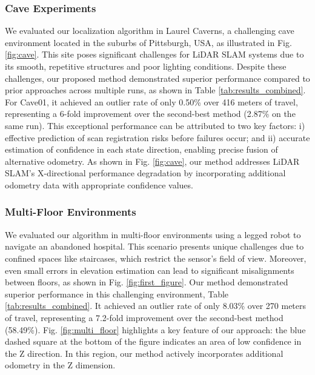 \subsubsection{\textbf{Cave Experiments}}
\newcommand{\cmark}{\ding{51}}%
\newcommand{\xmark}{\ding{55}}%
\setlength{\tabcolsep}{5pt}

We evaluated our localization algorithm in Laurel Caverns, a challenging cave environment located in the suburbs of Pittsburgh, USA, as illustrated in Fig. \ref{fig:cave}. This site poses significant challenges for LiDAR SLAM systems due to its smooth, repetitive structures and poor lighting conditions.
Despite these challenges, our proposed method demonstrated superior performance compared to prior approaches across multiple runs, as shown in Table \ref{tab:results_combined}. For Cave01, it achieved an outlier rate of only 0.50\% over 416 meters of travel, representing a 6-fold improvement over the second-best method (2.87\% on the same run). This exceptional performance can be attributed to two key factors:
i) effective prediction of scan registration risks before failures occur; and
ii) accurate estimation of confidence in each state direction, enabling precise fusion of alternative odometry. As shown in Fig. \ref{fig:cave}, our method addresses LiDAR SLAM's X-directional performance degradation by incorporating additional odometry data with appropriate confidence values.


\subsubsection{\textbf{Multi-Floor Environments}} We evaluated our algorithm in multi-floor environments using a legged robot to navigate an abandoned hospital. This scenario presents unique challenges due to confined spaces like staircases, which restrict the sensor's field of view. Moreover, even small errors in elevation estimation can lead to significant misalignments between floors, as shown in Fig. \ref{fig:first_figure}.
Our method demonstrated superior performance in this challenging environment, Table \ref{tab:results_combined}. It achieved an outlier rate of only 8.03\% over 270 meters of travel, representing a 7.2-fold improvement over the second-best method (58.49\%).
Fig. \ref{fig:multi_floor} highlights a key feature of our approach: the blue dashed square at the bottom of the figure indicates an area of low confidence in the Z direction. In this region, our method actively incorporates additional odometry in the Z dimension.

